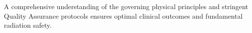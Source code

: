 A comprehensive understanding of the governing physical principles and stringent Quality Assurance protocols ensures optimal clinical outcomes and fundamental radiation safety.